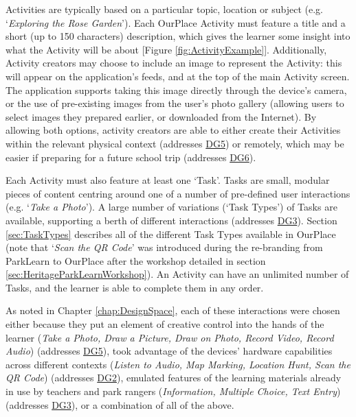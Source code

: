 Activities are typically based on a particular topic, location or subject (e.g. `\textit{Exploring the Rose Garden}'). Each OurPlace Activity must feature a title and a short (up to 150 characters) description, which gives the learner some insight into what the Activity will be about [Figure \ref{fig:ActivityExample}]. Additionally, Activity creators may choose to include an image to represent the Activity: this will appear on the application's feeds, and at the top of the main Activity screen. The application supports taking this image directly through the device's camera, or the use of pre-existing images from the user's photo gallery (allowing users to select images they prepared earlier, or downloaded from the Internet). By allowing both options, activity creators are able to either create their Activities within the relevant physical context (addresses \hyperref[DG5]{DG5}) or remotely, which may be easier if preparing for a future school trip (addresses \hyperref[DG6]{DG6}).

Each Activity must also feature at least one `Task'. Tasks are small, modular pieces of content centring around one of a number of pre-defined user interactions (e.g. `\textit{Take a Photo}'). A large number of variations (`Task Types') of Tasks are available, supporting a berth of different interactions (addresses \hyperref[DG3]{DG3}). Section \ref{sec:TaskTypes} describes all of the different Task Types available in OurPlace (note that `\textit{Scan the QR Code}' was introduced during the re-branding from ParkLearn to OurPlace after the workshop detailed in section \ref{sec:HeritageParkLearnWorkshop}). An Activity can have an unlimited number of Tasks, and the learner is able to complete them in any order.

As noted in Chapter \ref{chap:DesignSpace}, each of these interactions were chosen either because they put an element of creative control into the hands of the learner (\textit{Take a Photo, Draw a Picture, Draw on Photo, Record Video, Record Audio}) (addresses \hyperref[DG5]{DG5}), took advantage of the devices’ hardware capabilities across different contexts (\textit{Listen to Audio, Map Marking, Location Hunt, Scan the QR Code}) (addresses \hyperref[DG2]{DG2}), emulated features of the learning materials already in use by teachers and park rangers (\textit{Information, Multiple Choice, Text Entry}) (addresses \hyperref[DG3]{DG3}), or a combination of all of the above.

